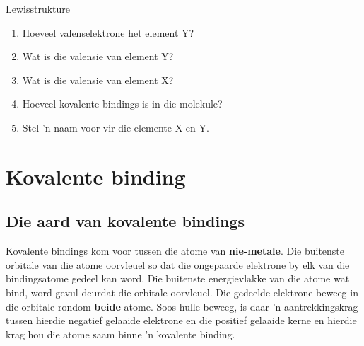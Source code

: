 \begin{exercises}{Lewisstrukture}
{\begin{enumerate}[noitemsep, label=\textbf{\arabic*}. ]
    \setcounter{subfigure}{0}
	\begin{figure}[H] %
\begin{center}
\end{center}
 \end{figure}       \label{m38701*id141181}\begin{enumerate}[noitemsep, label=\textbf{\alph*}. ] 
            \label{m38701*uid39}\item Hoeveel valenselektrone het element $\text{Y}$?
\label{m38701*uid40}\item Wat is die valensie van element $\text{Y}$?
\label{m38701*uid41}\item Wat is die valensie van element $\text{X}$?
\label{m38701*uid42}\item Hoeveel kovalente bindings is in die molekule?
\label{m38701*uid43}\item Stel 'n naam voor vir die elemente $\text{X}$ en $\text{Y}$.
\end{enumerate}
                \end{enumerate}

}
\end{exercises}


            \section{Kovalente binding}
            \nopagebreak
            \label{m38704*uid6}
            \subsection*{Die aard van kovalente bindings}
            \nopagebreak
        \label{m38704*id138956}
Kovalente bindings kom voor tussen die atome van \textbf{nie-metale}. Die buitenste orbitale van die atome oorvleuel so dat die ongepaarde elektrone by elk van die bindingsatome gedeel kan word. Die buitenste energievlakke van die atome wat bind, word gevul deurdat die orbitale oorvleuel. Die gedeelde elektrone beweeg in die orbitale rondom \textbf{beide} atome. Soos hulle beweeg, is daar 'n aantrekkingskrag tussen hierdie negatief gelaaide elektrone en die positief gelaaide kerne en hierdie krag hou die atome saam binne 'n kovalente binding.\par 

